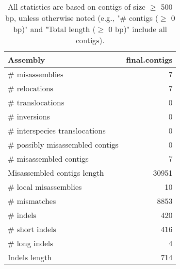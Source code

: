 \documentclass[12pt,a4paper]{article}
\begin{document}
\begin{table}[ht]
\begin{center}
\caption{All statistics are based on contigs of size $\geq$ 500 bp, unless otherwise noted (e.g., "\# contigs ($\geq$ 0 bp)" and "Total length ($\geq$ 0 bp)" include all contigs).}
\begin{tabular}{|l*{1}{|r}|}
\hline
Assembly & final.contigs \\ \hline
\# misassemblies & 7 \\ \hline
\hspace{5mm}\# relocations & 7 \\ \hline
\hspace{5mm}\# translocations & 0 \\ \hline
\hspace{5mm}\# inversions & 0 \\ \hline
\hspace{5mm}\# interspecies translocations & 0 \\ \hline
\# possibly misassembled contigs & 0 \\ \hline
\# misassembled contigs & 7 \\ \hline
Misassembled contigs length & 30951 \\ \hline
\# local misassemblies & 10 \\ \hline
\# mismatches & 8853 \\ \hline
\# indels & 420 \\ \hline
\hspace{5mm}\# short indels & 416 \\ \hline
\hspace{5mm}\# long indels & 4 \\ \hline
Indels length & 714 \\ \hline
\end{tabular}
\end{center}
\end{table}
\end{document}
